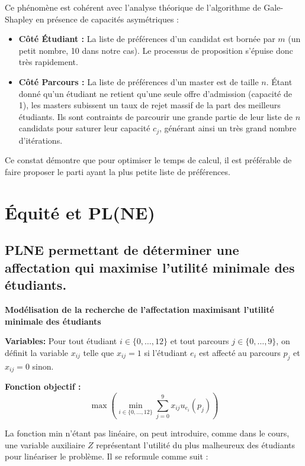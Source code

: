 \documentclass{article}
\begin{document}
Ce phénomène est cohérent avec l'analyse théorique de l'algorithme de Gale-Shapley en présence de capacités asymétriques :
\begin{itemize}
    \item \textbf{Côté Étudiant :} La liste de préférences d'un candidat est bornée par $m$ (un petit nombre, 10 dans notre cas). Le processus de proposition s'épuise donc très rapidement.
    \item \textbf{Côté Parcours :} La liste de préférences d'un master est de taille $n$. Étant donné qu'un étudiant ne retient qu'une seule offre d'admission (capacité de 1), les masters subissent un taux de rejet massif de la part des meilleurs étudiants. Ils sont contraints de parcourir une grande partie de leur liste de $n$ candidats pour saturer leur capacité $c_j$, générant ainsi un très grand nombre d'itérations.
\end{itemize}
Ce constat démontre que pour optimiser le temps de calcul, il est préférable de faire proposer le parti ayant la plus petite liste de préférences.



\vspace{1cm}
\section{Équité et PL(NE)}
\subsection{PLNE permettant de déterminer une affectation qui maximise l’utilité minimale des étudiants.}

\noindent\textbf{Modélisation de la recherche de l'affectation maximisant l'utilité minimale des étudiants}

\vspace{0.3cm}
\noindent\textbf{Variables:} Pour tout étudiant $i \in \{0,\dots,12\}$ et tout parcours $j \in \{0,\dots,9\}$, on définit la variable $x_{ij}$ telle que $x_{ij} = 1$ si l'étudiant $e_i$ est affecté au parcours $p_j$ et $x_{ij} = 0$ sinon.

\vspace{0.3cm}
\noindent\textbf{Fonction objectif :} 
\[ \max \left( \min_{i \in \{0,\dots,12\}} \sum_{j=0}^{9} x_{ij} u_{e_i}(p_j) \right) \]

La fonction min n'étant pas linéaire, on peut introduire, comme dans le cours, une variable auxiliaire $Z$ représentant l'utilité du plus malheureux des étudiants pour linéariser le problème. Il se reformule comme suit :
\end{document}
